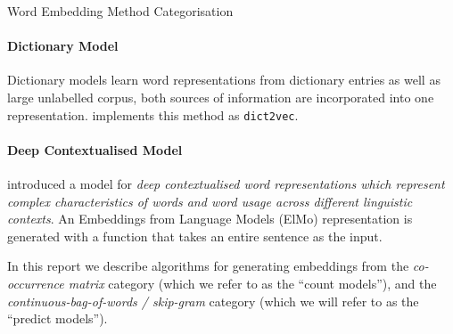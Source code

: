 \documentclass{ucetd}
\begin{document}
\begin{infobox}{Word Embedding Method Categorisation}
  \paragraph{Dictionary Model}\label{dictionary-model} Dictionary models learn word representations from dictionary entries as well as large unlabelled corpus, both sources of information are incorporated into one representation. \parencite{tissier-etal-2017-dict2vec} implements this method as \texttt{dict2vec}.
  \paragraph{Deep Contextualised Model}\label{deep-contextualised-model} \parencite{peters18-deep-contex-word-repres} introduced a model for \emph{deep contextualised word representations which represent complex characteristics of words and word usage across different linguistic contexts}. An Embeddings from Language Models (ElMo) representation is generated with a function that takes an entire sentence as the input.
\end{infobox}
In this report we describe algorithms for generating embeddings from the \emph{co-occurrence matrix} category (which we refer to as the ``count models''), and the \emph{continuous-bag-of-words / skip-gram} category (which we will refer to as the ``predict models'').
\end{document}
